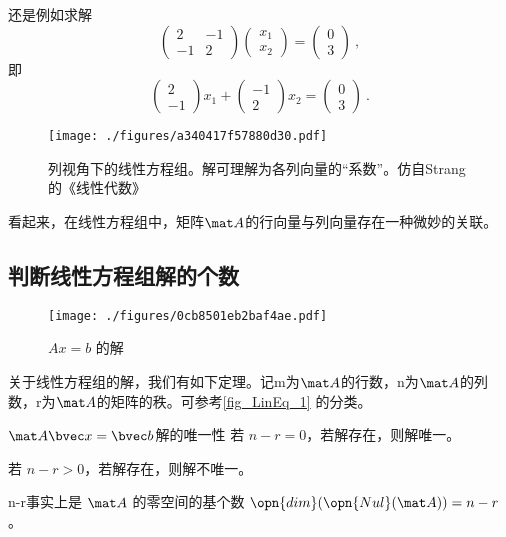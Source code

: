 \begin{example}{}
还是例如求解
$$
\begin{pmatrix}
2&-1 \\
-1&2
\end{pmatrix}
\begin{pmatrix}
x_1 \\
x_2
\end{pmatrix}
=
\begin{pmatrix}
0 \\
3
\end{pmatrix}~,
$$
即
$$
\begin{pmatrix}
2 \\
-1
\end{pmatrix}
x_1
+
\begin{pmatrix}
-1 \\
2
\end{pmatrix}
x_2
=
\begin{pmatrix}
0 \\
3
\end{pmatrix}~.
$$
\begin{figure}[ht]
\centering
\texttt{[image: ./figures/a340417f57880d30.pdf]}
\caption{列视角下的线性方程组。解可理解为各列向量的“系数”。仿自Strang的《线性代数》} \label{fig_LinEq_4}
\end{figure}
\end{example}
看起来，在线性方程组中，矩阵$\mat A$的行向量与列向量存在一种微妙的关联。

\subsection{判断线性方程组解的个数}
\begin{figure}[ht]
\centering
\texttt{[image: ./figures/0cb8501eb2baf4ae.pdf]}
\caption{$Ax=b$ 的解} \label{fig_LinEq_1}
\end{figure}


关于线性方程组的解，我们有如下定理。记m为$\mat A$的行数，n为$\mat A$的列数，r为$\mat A$的矩阵的秩。可参考\autoref{fig_LinEq_1} 的分类。

\begin{theorem}{$\mat A \bvec x=\bvec b$解的唯一性}
若 $n-r=0$，若解存在，则解唯一。

若 $n-r>0$，若解存在，则解不唯一。
\end{theorem}
n-r事实上是 $\mat A$ 的零空间的基个数 $\opn{dim}(\opn{Nul}(\mat A))=n-r$。

